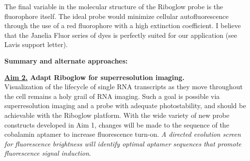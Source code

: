 The final variable in the molecular structure of the Riboglow probe is the fluorophore itself. The ideal probe would minimize cellular autofluorescence through the use of a red fluorophore with a high extinction coefficient. I believe that the Janelia Fluor series of dyes is perfectly suited for our application (see Lavis support letter).\cite{Grimmgeneralmethodfinetune2017a} 

\textbf{Summary and alternate approaches:}

\textbf{\underline{Aim 2.} Adapt Riboglow for superresolution imaging.}\\
Visualization of the lifecycle of single RNA transcripts as they move throughout the cell remains a holy grail of RNA imaging.\comment{[Cite]} Such a goal is possible via superresolution imaging and a probe with adequate photostability, and should be achievable with the Riboglow platform.
With the wide variety of new probe constructs developed in Aim 1, changes will be made to the sequence of the cobalamin aptamer to increase fluorescence turn-on. \textit{A directed evolution screen for fluorescence brightness will identify optimal aptamer sequences that promote fluorescence signal induction}.

